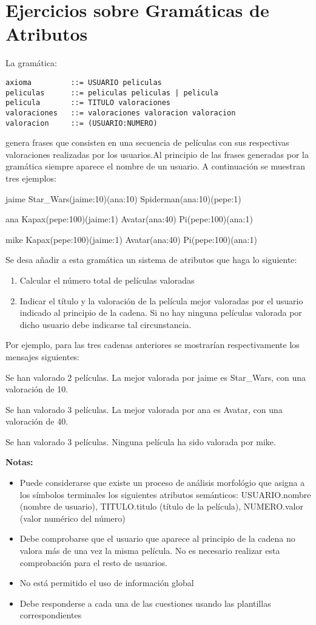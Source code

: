 \section{Ejercicios sobre Gramáticas de Atributos}
La gramática:
\begin{verbatim}
axioma         ::= USUARIO peliculas
peliculas      ::= peliculas peliculas | pelicula
pelicula       ::= TITULO valoraciones
valoraciones   ::= valoraciones valoracion valoracion
valoracion     ::= (USUARIO:NUMERO)
\end{verbatim}
genera frases que consisten en una secuencia de películas con sus respectivas valoraciones realizadas por los usuarios.Al principio de las frases generadas por la
gramática siempre aparece el nombre de un usuario. A continuación se muestran tres ejemplos:

jaime Star\_Wars(jaime:10)(ana:10) Spiderman(ana:10)(pepe:1)

ana Kapax(pepe:100)(jaime:1) Avatar(ana:40) Pi(pepe:100)(ana:1)

mike Kapax(pepe:100)(jaime:1) Avatar(ana:40) Pi(pepe:100)(ana:1)


Se desa añadir a esta gramática un sistema de atributos que haga lo siguiente:
\begin{enumerate}
\item Calcular el número total de películas valoradas
\item Indicar el título y la valoración de la película mejor valoradas por el usuario indicado al principio de la cadena. Si no hay ninguna películas valorada por dicho usuario debe indicarse tal circunstancia.
\end{enumerate}

Por ejemplo, para las tres cadenas anteriores se mostrarían respectivamente los mensajes siguientes:

Se han valorado 2 películas.
La mejor valorada por jaime es Star\_Wars, con una valoración de 10.

Se han valorado 3 películas.
La mejor valorada por ana es Avatar, con una valoración de 40.

Se han valorado 3 películas.
Ninguna película ha sido valorada por mike.


\textbf{Notas:}
\begin{itemize}
\item Puede considerarse que existe un proceso de análisis morfológio que asigna a los símbolos terminales los siguientes atributos semánticos: USUARIO.nombre (nombre de usuario), TITULO.titulo (título de la película), NUMERO.valor (valor numérico del número)
\item Debe comprobarse que el usuario que aparece al principio de la cadena no valora más de una vez la misma película. No es necesario realizar esta comprobación para el resto de usuarios.
\item No está permitido el uso de información global
\item Debe responderse a cada una de las cuestiones usando las plantillas correspondientes
\end{itemize}
\newpage

